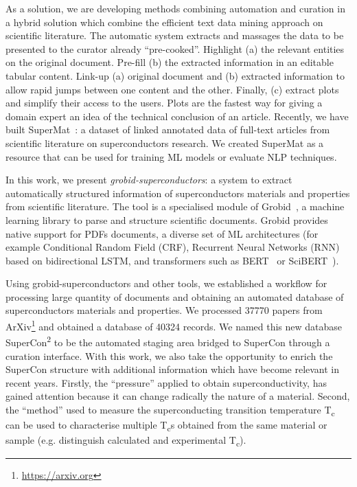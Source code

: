 \documentclass{article}
\begin{document}
As a solution, we are developing methods combining automation and curation in a hybrid solution which combine the efficient text data mining approach on scientific literature.
The automatic system extracts and massages the data to be presented to the curator already ``pre-cooked''. 
Highlight (a) the relevant entities on the original document. Pre-fill (b) the extracted information in an editable tabular content. Link-up (a) original document and (b) extracted information to allow rapid jumps between one content and the other.
Finally, (c) extract plots and simplify their access to the users. Plots are the fastest way for giving a domain expert an idea of the technical conclusion of an article.
Recently, we have built SuperMat~\cite{foppiano2021supermat}: a dataset of linked annotated data of full-text articles from scientific literature on superconductors research. 
We created SuperMat as a resource that can be used for training ML models or evaluate NLP techniques.

In this work, we present \textit{grobid-superconductors}: a system to extract automatically structured information of superconductors materials and properties from scientific literature. 
The tool is a specialised module of Grobid~\cite{GROBID}, a machine learning library to parse and structure scientific documents. 
Grobid provides native support for PDFs documents, a diverse set of ML architectures (for example Conditional Random Field (CRF), Recurrent Neural Networks (RNN) based on bidirectional LSTM, and transformers such as BERT~\cite{devlin2018bert} or SciBERT~\cite{Beltagy2019SciBERT}).

Using grobid-superconductors and other tools, we established a workflow for processing large quantity of documents and obtaining an automated database of superconductors materials and properties. 
We processed 37770 papers from ArXiv\footnote{\url{https://arxiv.org}} and obtained a database of 40324 records. 
We named this new database SuperCon\textsuperscript{2} to be the automated staging area bridged to SuperCon through a curation interface. 
With this work, we also take the opportunity to enrich the SuperCon structure with additional information which have become relevant in recent years. 
Firstly, the ``pressure'' applied to obtain superconductivity, has gained attention because it can change radically the nature of a material. 
Second, the ``method'' used to measure the superconducting transition temperature T\textsubscript{c} can be used to characterise multiple T\textsubscript{c}s obtained from the same material or sample (e.g. distinguish calculated and experimental T\textsubscript{c}). 
\end{document}
